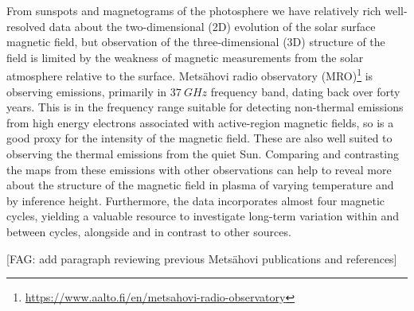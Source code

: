 \documentclass{aa}
\newcommand{\fag}[1]{\textcolor{midpurple}{[FAG: #1]}} %
\begin{document}
  From sunspots and magnetograms of the photosphere we have relatively rich
  well-resolved
  data about the 
  two-dimensional (2D) 
  evolution of the solar surface magnetic 
  field, but observation of the three-dimensional (3D)
  structure of the field is limited by the 
  weakness of magnetic measurements from the solar atmosphere relative to the
  surface.
  Mets\"ahovi radio observatory (MRO)\footnote{
  \href{https://www.aalto.fi/en/metsahovi-radio-observatory}{
        https://www.aalto.fi/en/metsahovi-radio-observatory}}
  is observing emissions, primarily in
  $\SI{37}{GHz}$ frequency band, dating back over forty years.
  This is in the frequency range suitable for detecting non-thermal emissions
  from high energy electrons associated with active-region magnetic fields, so %
  is a good proxy for the intensity of the magnetic field.
  These are also well suited to observing the thermal emissions from the quiet
  Sun.
  Comparing and contrasting the maps from these emissions with other
  observations can help to reveal more about the structure of the magnetic
  field in plasma of varying temperature and by inference height.
  Furthermore, the data incorporates almost four magnetic cycles, yielding
  a valuable resource to investigate long-term variation within and between 
  cycles, alongside and in contrast to other sources.

  \fag{add paragraph reviewing previous Mets\"ahovi publications and references}
\end{document}
